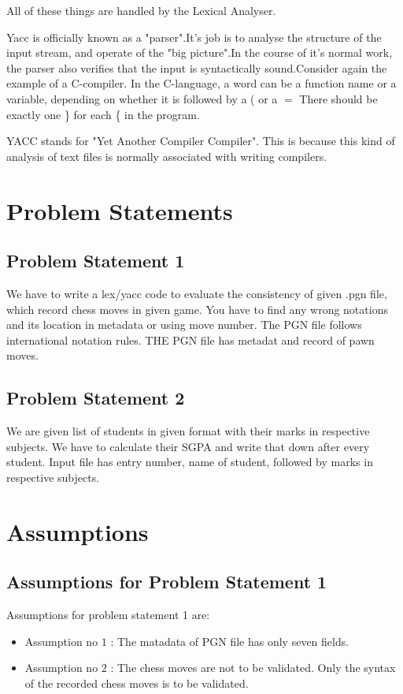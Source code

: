 \documentclass[12pt]{article}
\begin{document}
All of these things are handled by the Lexical Analyser. 


  Yacc is officially known as a "parser".It's job is to analyse the structure of the input stream, and operate of the "big picture".In the course of it's normal work, the parser also verifies that the input is syntactically sound.Consider again the example of a C-compiler. In the C-language, a word can be a function name or a variable, depending on whether it is followed by a ( or a $=$ There should be exactly one \} for each \{ in the program.

YACC stands for "Yet Another Compiler Compiler". This is because this kind of analysis of text files is normally associated with writing compilers.










\newpage
\section{Problem Statements}

\subsection{Problem Statement 1}
We have to write a lex/yacc code to evaluate the consistency of given .pgn file, which record chess moves in given game. You have to find any wrong notations and its location in metadata or using move number. The PGN file follows international notation rules. THE PGN file has metadat and record of pawn moves.

\subsection{Problem Statement 2}
We are given list of students in given format with their marks in respective subjects. We have to calculate their SGPA and write that down after every student. Input file has entry number, name of student, followed by marks in respective subjects.


\newpage

\section{Assumptions}
\subsection{Assumptions for Problem Statement 1}
Assumptions for problem statement 1 are:
\begin{itemize}
\item Assumption no $1$ : The matadata of PGN file has only seven fields.
\item Assumption no $2$ : The chess moves are not to be validated. Only the syntax of the recorded chess moves is to be validated.
\end{itemize}
\end{document}
